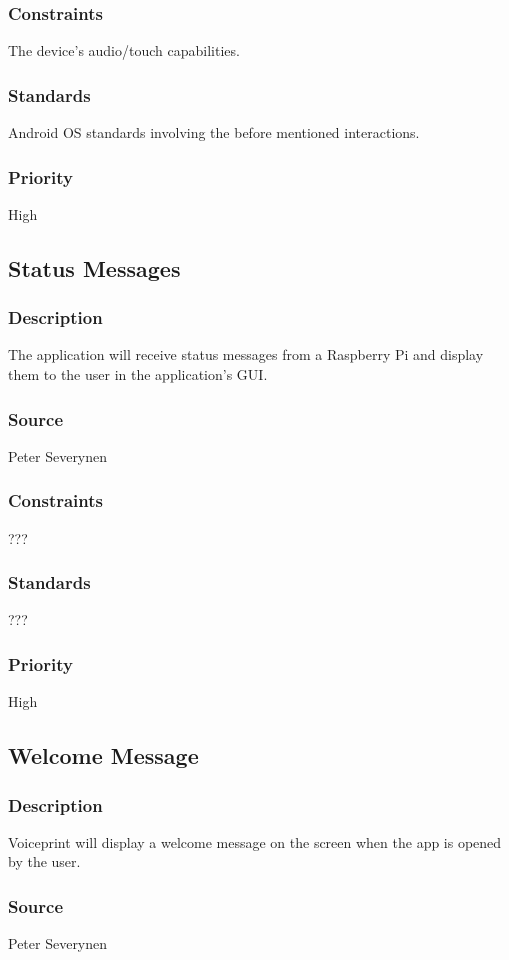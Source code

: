 \subsubsection{Constraints}
The device's audio/touch capabilities.
\subsubsection{Standards}
Android OS standards involving the before mentioned interactions.
\subsubsection{Priority}
High
\subsection{Status Messages}
\subsubsection{Description}
The application will receive status messages from a Raspberry Pi and display them to the user in the application's GUI.
\subsubsection{Source}
Peter Severynen
\subsubsection{Constraints}
???
\subsubsection{Standards}
???
\subsubsection{Priority}
High
\subsection{Welcome Message}
\subsubsection{Description}
Voiceprint will display a welcome message on the screen when the app is opened by the user.
\subsubsection{Source}
Peter Severynen
